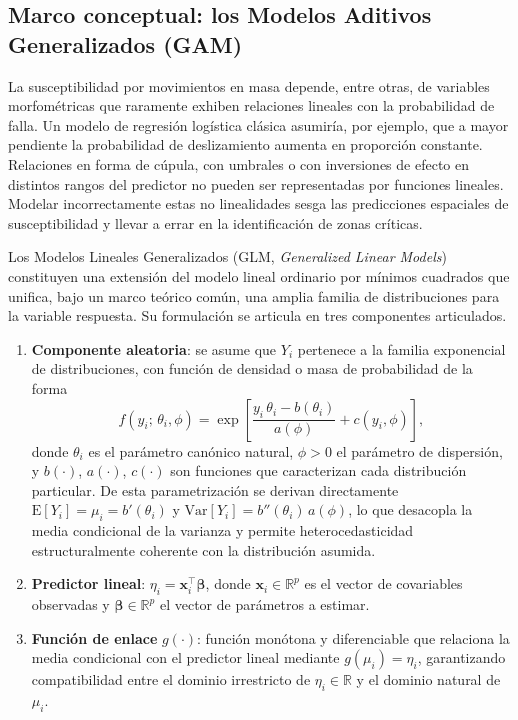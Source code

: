 \documentclass[12pt,a4paper]{article}
\begin{document}
\subsection{Marco conceptual: los Modelos Aditivos Generalizados (GAM)}

La susceptibilidad por movimientos en masa depende, entre otras, de variables morfométricas
que raramente exhiben relaciones lineales con la probabilidad de falla.
Un modelo de regresión logística clásica asumiría, por ejemplo, que a mayor
pendiente la probabilidad de deslizamiento aumenta en proporción constante.
Relaciones en forma de cúpula, con umbrales o con inversiones de efecto
en distintos rangos del predictor no pueden ser representadas por funciones
lineales. Modelar incorrectamente estas no
linealidades sesga las predicciones espaciales de susceptibilidad y
llevar a errar en la identificación de zonas críticas.

Los Modelos Lineales Generalizados (GLM, \textit{Generalized Linear
Models}) \citep{nelder1972generalized, mccullagh1989generalized}
constituyen una extensión del modelo lineal ordinario por mínimos
cuadrados que unifica, bajo un marco teórico común, una amplia familia
de distribuciones para la variable respuesta. Su formulación se
articula en tres componentes articulados.

\begin{enumerate}
    


\item  \textbf{Componente aleatoria}: se asume que $Y_i$ pertenece a la
familia exponencial de distribuciones, con función de densidad o masa
de probabilidad de la forma
\begin{equation}
    f(y_i;\,\theta_i,\phi) = \exp\!\left[
        \frac{y_i\,\theta_i - b(\theta_i)}{a(\phi)} + c(y_i,\phi)
    \right],
    \label{eq:glm}
\end{equation}
donde $\theta_i$ es el parámetro canónico natural, $\phi > 0$ el
parámetro de dispersión, y $b(\cdot)$, $a(\cdot)$, $c(\cdot)$ son
funciones que caracterizan cada distribución particular. De esta
parametrización se derivan directamente
$\mathrm{E}[Y_i] = \mu_i = b'(\theta_i)$ y
$\mathrm{Var}[Y_i] = b''(\theta_i)\,a(\phi)$, lo que desacopla la
media condicional de la varianza y permite heterocedasticidad
estructuralmente coherente con la distribución asumida.
\item \textbf{Predictor lineal}: $\eta_i = \mathbf{x}_i^\top
\boldsymbol{\beta}$, donde $\mathbf{x}_i \in \mathbb{R}^p$ es el
vector de covariables observadas y $\boldsymbol{\beta} \in \mathbb{R}^p$
el vector de parámetros a estimar.
\item \textbf{Función de enlace} $g(\cdot)$: función monótona y
diferenciable que relaciona la media condicional con el predictor
lineal mediante $g(\mu_i) = \eta_i$, garantizando compatibilidad entre
el dominio irrestricto de $\eta_i \in \mathbb{R}$ y el dominio natural
de $\mu_i$.
\end{enumerate}
\end{document}
